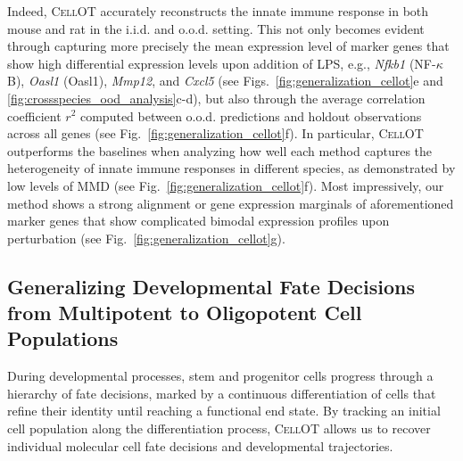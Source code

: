 Indeed, \textsc{CellOT} accurately reconstructs the innate immune response in both mouse and rat in the i.i.d. and o.o.d. setting. This not only becomes evident through capturing more precisely the mean expression level of marker genes that show high differential expression levels upon addition of LPS, e.g., \textit{Nfkb1} (NF-$\kappa$B), \textit{Oasl1} (Oasl1), \textit{Mmp12}, and \textit{Cxcl5} (see Figs.~\ref{fig:generalization_cellot}e and \ref{fig:crossspecies_ood_analysis}c-d), but also through the average correlation coefficient $r^2$ computed between o.o.d. predictions and holdout observations across all genes (see Fig.~\ref{fig:generalization_cellot}f).
In particular, \textsc{CellOT} outperforms the baselines when analyzing how well each method captures the heterogeneity of innate immune responses in different species, as demonstrated by low levels of MMD (see Fig.~\ref{fig:generalization_cellot}f).
Most impressively, our method shows a strong alignment or gene expression marginals of aforementioned marker genes that show complicated bimodal expression profiles upon perturbation (see Fig.~\ref{fig:generalization_cellot}g).

\subsection{Generalizing Developmental Fate Decisions from Multipotent to Oligopotent Cell Populations}

 During developmental processes, stem and progenitor cells progress through a hierarchy of fate decisions, marked by a continuous differentiation of cells that refine their identity until reaching a functional end state.
By tracking an initial cell population along the differentiation process, \textsc{CellOT} allows us to recover individual molecular cell fate decisions and developmental trajectories. 

